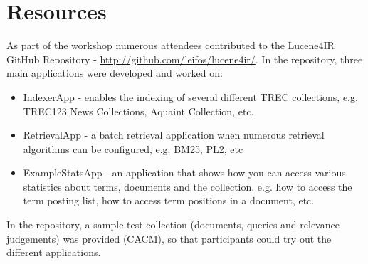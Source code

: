 \section{Resources}
As part of the workshop numerous attendees contributed to the Lucene4IR GitHub Repository - \url{http://github.com/leifos/lucene4ir/}. In the repository, three main applications were developed and worked on:
\begin{itemize}
	\item IndexerApp - enables the indexing of several different TREC collections, e.g. TREC123 News Collections, Aquaint Collection, etc.
	\item RetrievalApp - a batch retrieval application when numerous retrieval algorithms can be configured, e.g. BM25, PL2, etc
	\item ExampleStatsApp - an application that shows how you can access various statistics about terms, documents and the collection. e.g. how to access the term posting list, how to access term positions in a document, etc.
	\end{itemize}

In the repository, a sample test collection (documents, queries and relevance judgements) was provided (CACM), so that participants could try out the different applications.

